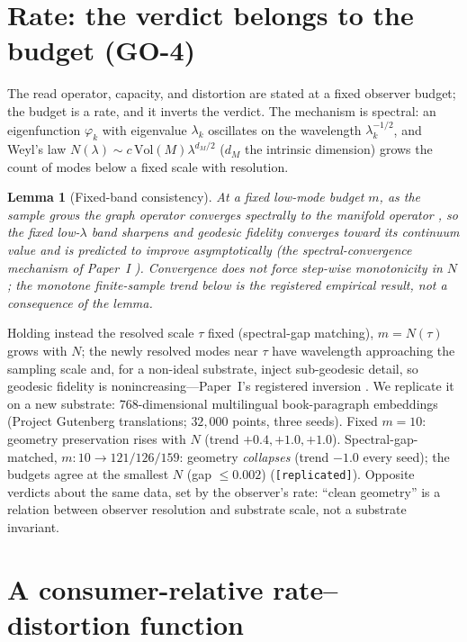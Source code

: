\documentclass[11pt]{article}
\newtheorem{lemma}{Lemma}
\theoremstyle{definition}
\theoremstyle{remark}
\begin{document}
\section{Rate: the verdict belongs to the budget (GO-4)}\label{sec:rate}

The read operator, capacity, and distortion are stated at a fixed observer budget;
the budget is a rate, and it inverts the verdict. The mechanism is spectral: an
eigenfunction $\varphi_k$ with eigenvalue $\lambda_k$ oscillates on the wavelength
$\lambda_k^{-1/2}$, and Weyl's law $N(\lambda)\sim c\,\mathrm{Vol}(M)\lambda^{d_M/2}$
($d_M$ the intrinsic dimension) grows the count of modes below a fixed scale with
resolution.

\begin{lemma}[Fixed-band consistency]\label{lem:band}
At a fixed low-mode budget $m$, as the sample grows the graph operator converges
spectrally to the manifold operator \cite{calder2022}, so the fixed low-$\lambda$
band sharpens and geodesic fidelity \emph{converges toward its continuum value} and is
predicted to improve asymptotically (the spectral-convergence mechanism of
Paper~I \cite{paper1}). Convergence does not force step-wise monotonicity in $N$; the
monotone finite-sample trend below is the \emph{registered empirical} result, not a
consequence of the lemma.
\end{lemma}

Holding instead the resolved scale $\tau$ fixed (spectral-gap matching), $m=N(\tau)$
grows with $N$; the newly resolved modes near $\tau$ have wavelength approaching the
sampling scale and, for a non-ideal substrate, inject sub-geodesic detail, so
geodesic fidelity is nonincreasing---Paper~I's registered inversion \cite{paper1}. We
replicate it on a new substrate: $768$-dimensional multilingual book-paragraph
embeddings (Project Gutenberg translations; $32{,}000$ points, three seeds). Fixed
$m=10$: geometry preservation rises with $N$ (trend $+0.4,+1.0,+1.0$).
Spectral-gap-matched, $m:10\to121/126/159$: geometry \emph{collapses} (trend $-1.0$
every seed); the budgets agree at the smallest $N$ (gap $\le0.002$)
(\texttt{[replicated]}). Opposite verdicts about the same data, set by the observer's
rate: ``clean geometry'' is a relation between observer resolution and substrate
scale, not a substrate invariant.

\section{A consumer-relative rate--distortion function}\label{sec:rd}
\end{document}
